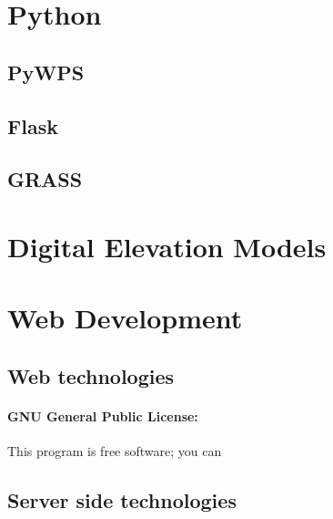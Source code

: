 
\section{Python}\label{sec:issues}

\subsection*{PyWPS}


\subsection*{Flask}

\subsection*{GRASS}


\section{Digital Elevation Models}


\section{Web Development}
\subsection*{Web technologies}
\paragraph{GNU General Public License:} This program is free software; you can 

\subsection*{Server side technologies}